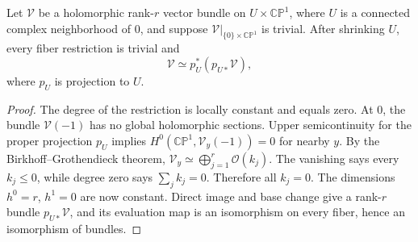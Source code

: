 \begin{lemma}
Let $\mathcal V$ be a holomorphic rank-$r$ vector bundle on
$U\times\mathbb{CP}^1$, where $U$ is a connected complex neighborhood of
$0$, and suppose $\mathcal V|_{\{0\}\times\mathbb{CP}^1}$ is trivial.
After shrinking $U$, every fiber restriction is trivial and
\[
\mathcal V\simeq p_U^*(p_{U*}\mathcal V),
\]
where $p_U$ is projection to $U$.
\end{lemma}
\begin{proof}
The degree of the restriction is locally constant and equals zero.
At $0$, the bundle $\mathcal V(-1)$ has no global holomorphic sections.
Upper semicontinuity for the proper projection $p_U$ implies
$H^0(\mathbb{CP}^1,\mathcal V_y(-1))=0$ for nearby $y$.
By the Birkhoff--Grothendieck theorem,
$\mathcal V_y\simeq\bigoplus_{j=1}^r\mathcal O(k_j)$.
The vanishing says every $k_j\leq0$, while degree zero says
$\sum_jk_j=0$. Therefore all $k_j=0$.
The dimensions $h^0=r$, $h^1=0$ are now constant. Direct image and base
change give a rank-$r$ bundle $p_{U*}\mathcal V$, and its evaluation map
is an isomorphism on every fiber, hence an isomorphism of bundles.
\end{proof}

